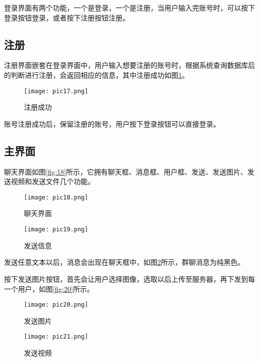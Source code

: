 \documentclass[forprint]{OSPaper}
\begin{document}
登录界面有两个功能，一个是登录，一个是注册，当用户输入完账号时，可以按下登录按钮登录，或者按下注册按钮注册。

\subsection{注册}

注册界面嵌套在登录界面中，用户输入想要注册的账号时，根据系统查询数据库后的判断进行注册，会返回相应的信息，其中注册成功如图\ref{fig:17}。

\begin{figure}[!htbp]
	\centering
	\texttt{[image: pic17.png]}
	\caption{注册成功}
	\label{fig:17}
\end{figure}

账号注册成功后，保留注册的账号，用户按下登录按钮可以直接登录。

\subsection{主界面}

聊天界面如图\ref{fig:18}所示，它拥有聊天框、消息框、用户框、发送、发送图片、发送视频和发送文件几个功能。

\begin{figure}[ht]
	\centering
	\begin{minipage}[t]{0.45\linewidth}
		\centering
		\texttt{[image: pic18.png]}
		\caption{聊天界面}
		\label{fig:18}
	\end{minipage}%
	\begin{minipage}[t]{0.45\linewidth}
		\centering
		\texttt{[image: pic19.png]}
		\caption{发送信息}
		\label{fig:19}
	\end{minipage}%
\end{figure}

发送任意文本以后，消息会出现在聊天框中，如图\ref{fig:19}所示，群聊消息为纯黑色。

按下发送图片按钮，首先会让用户选择图像，选取以后上传至服务器，再下发到每一个用户，如图\ref{fig:20}所示。

\begin{figure}[ht]
	\centering
	\begin{minipage}[t]{0.45\linewidth}
		\centering
		\texttt{[image: pic20.png]}
		\caption{发送图片}
		\label{fig:20}
	\end{minipage}%
	\begin{minipage}[t]{0.45\linewidth}
		\centering
		\texttt{[image: pic21.png]}
		\caption{发送视频}
		\label{fig:21}
	\end{minipage}%
\end{figure}
\end{document}
